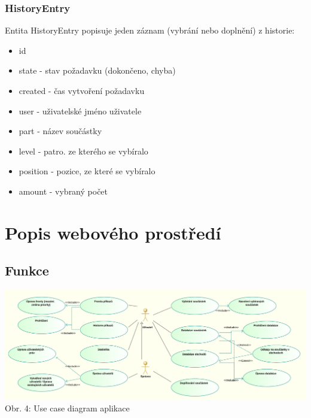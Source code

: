 \documentclass[12pt, a4paper, oneside]{article}
\begin{document}
\subsubsection{HistoryEntry}

Entita HistoryEntry popisuje jeden záznam (vybrání nebo doplnění) z historie:
\begin{itemize}
\item id
\item state - stav požadavku (dokončeno, chyba)
\item created - čas vytvoření požadavku
\item user - uživatelské jméno uživatele
\item part - název součástky
\item level - patro. ze kterého se vybíralo
\item position - pozice, ze které se vybíralo
\item amount - vybraný počet
\end{itemize}


\section{Popis webového prostředí}  %

\subsection{Funkce}

\begin{minipage}{\textwidth}
\begin{center}
\hspace*{-2cm}
\includegraphics[scale=0.69]{img/use_case_uml.png}
\\
\caption{Obr. 4: Use case diagram aplikace}
\end{center}
\end{minipage}
\vspace{4mm}
\end{document}
